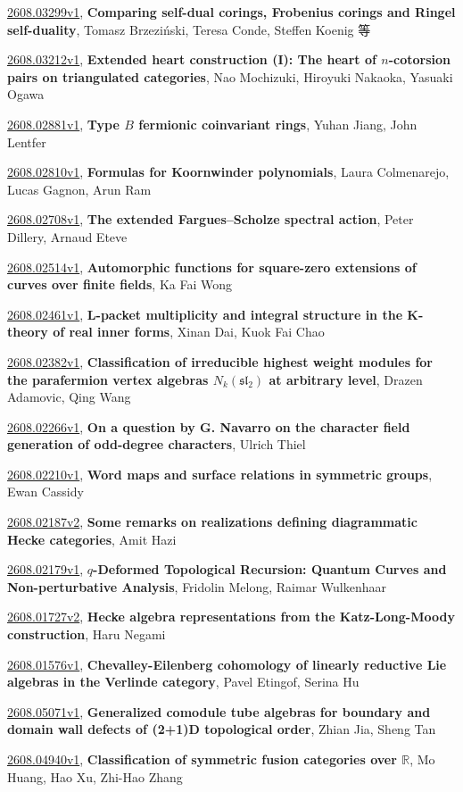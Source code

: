 \documentclass[9pt, a4paper]{article}
\theoremstyle{plain}
\theoremstyle{definition}
\theoremstyle{remark}
\newcommand{\arxiv}[3]{\href{https://arxiv.org/abs/#1}{#1}, \textbf{\textcolor{arxivblue}{#2}}, #3}
\begin{document}
\arxiv{2608.03299v1}{Comparing self-dual corings, Frobenius corings and Ringel self-duality}{Tomasz Brzeziński, Teresa Conde, Steffen Koenig 等}

\arxiv{2608.03212v1}{Extended heart construction (I): The heart of $n$-cotorsion pairs on triangulated categories}{Nao Mochizuki, Hiroyuki Nakaoka, Yasuaki Ogawa}

\arxiv{2608.02881v1}{Type $B$ fermionic coinvariant rings}{Yuhan Jiang, John Lentfer}

\arxiv{2608.02810v1}{Formulas for Koornwinder polynomials}{Laura Colmenarejo, Lucas Gagnon, Arun Ram}

\arxiv{2608.02708v1}{The extended Fargues--Scholze spectral action}{Peter Dillery, Arnaud Eteve}

\arxiv{2608.02514v1}{Automorphic functions for square-zero extensions of curves over finite fields}{Ka Fai Wong}

\arxiv{2608.02461v1}{L-packet multiplicity and integral structure in the K-theory of real inner forms}{Xinan Dai, Kuok Fai Chao}

\arxiv{2608.02382v1}{Classification of irreducible highest weight modules for the parafermion vertex algebras $N_k(\mathfrak{sl}_2)$ at arbitrary level}{Drazen Adamovic, Qing Wang}

\arxiv{2608.02266v1}{On a question by G. Navarro on the character field generation of odd-degree characters}{Ulrich Thiel}

\arxiv{2608.02210v1}{Word maps and surface relations in symmetric groups}{Ewan Cassidy}

\arxiv{2608.02187v2}{Some remarks on realizations defining diagrammatic Hecke categories}{Amit Hazi}

\arxiv{2608.02179v1}{$q$-Deformed Topological Recursion: Quantum Curves and Non-perturbative Analysis}{Fridolin Melong, Raimar Wulkenhaar}

\arxiv{2608.01727v2}{Hecke algebra representations from the Katz-Long-Moody construction}{Haru Negami}

\arxiv{2608.01576v1}{Chevalley-Eilenberg cohomology of linearly reductive Lie algebras in the Verlinde category}{Pavel Etingof, Serina Hu}

\arxiv{2608.05071v1}{Generalized comodule tube algebras for boundary and domain wall defects of (2+1)D topological order}{Zhian Jia, Sheng Tan}

\arxiv{2608.04940v1}{Classification of symmetric fusion categories over $\mathbb{R}$}{Mo Huang, Hao Xu, Zhi-Hao Zhang}
\end{document}
